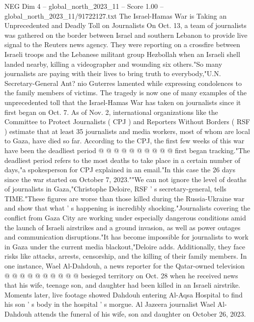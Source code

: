 \begin{textsample}{NEG Dim 4 – global\_north\_2023\_11 – Score 1.00 – global\_north\_2023\_11/91722127.txt}  \label{ex:f4_neg_187}
The Israel-Hamas War is Taking an Unprecedented and Deadly Toll on Journalists On Oct. 13, a team of journalists was gathered on the border between Israel and southern Lebanon to provide live signal to the Reuters news agency.
They were reporting on a crossfire between Israeli troops and the Lebanese militant group Hezbollah when an Israeli shell landed nearby, killing a videographer and wounding six others."So many journalists are paying with their lives to bring truth to everybody,"U.N.
Secretary-General Ant? nio Guterres lamented while expressing condolences to the family members of victims.
The tragedy is now one of many examples of the unprecedented toll that the Israel-Hamas War has taken on journalists since it first began on Oct. 7.
As of Nov. 2, international organizations like the Committee to Protect Journalists ( CPJ ) and Reporters Without Borders ( RSF ) estimate that at least 35 journalists and media workers, most of whom are local to Gaza, have died so far.
According to the CPJ, the first few weeks of this war have been the deadliest period @ @ @ @ @ @ @ @ @ @ first began tracking."The deadliest period refers to the most deaths to take place in a certain number of days,"a spokesperson for CPJ explained in an email."In this case the 26 days since the war started on October 7, 2023.""We can not ignore the level of deaths of journalists in Gaza,"Christophe Deloire, RSF ' s secretary-general, tells TIME."These figures are worse than those killed during the Russia-Ukraine war and show that what ' s happening is incredibly shocking."Journalists covering the conflict from Gaza City are working under especially dangerous conditions amid the launch of Israeli airstrikes and a ground invasion, as well as power outages and communication disruptions."It has become impossible for journalists to work in Gaza under the current media blackout,"Deloire adds.
Additionally, they face risks like attacks, arrests, censorship, and the killing of their family members.
In one instance, Wael Al-Dahdouh, a news reporter for the Qatar-owned television @ @ @ @ @ @ @ @ @ @ besieged territory on Oct. 28 when he received news that his wife, teenage son, and daughter had been killed in an Israeli airstrike.
Moments later, live footage showed Dahdouh entering Al-Aqsa Hospital to find his son ' s body in the hospital ' s morgue.
Al Jazeera journalist Wael Al-Dahdouh attends the funeral of his wife, son and daughter on October 26, 2023.

\end{textsample}
